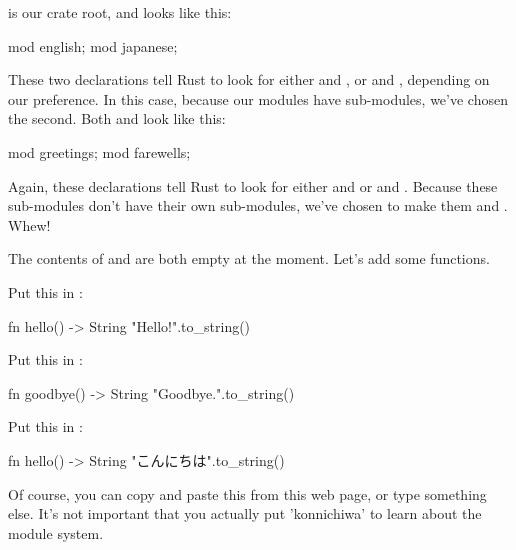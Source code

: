  is our crate root, and looks like this:

\begin{rustc}
mod english;
mod japanese;
\end{rustc}

These two declarations tell Rust to look for either  and , or  
and , depending on our preference. In this case, because our modules have sub-modules, we've chosen the 
second. Both  and  look like this:

\begin{rustc}
mod greetings;
mod farewells;
\end{rustc}

Again, these declarations tell Rust to look for either  and  or 
 and . Because these sub-modules don't have their own sub-modules, 
we've chosen to make them  and . Whew!

\blank

The contents of  and  are both empty at the moment. Let's add some functions.

\blank

Put this in :

\begin{rustc}
fn hello() -> String {
    "Hello!".to_string()
}
\end{rustc}

Put this in :

\begin{rustc}
fn goodbye() -> String {
    "Goodbye.".to_string()
}
\end{rustc}

Put this in :

\begin{rustc}
fn hello() -> String {
    "こんにちは".to_string()
}
\end{rustc}

Of course, you can copy and paste this from this web page, or type something else. It's not important that you actually put 
'konnichiwa' to learn about the module system.

\blank

